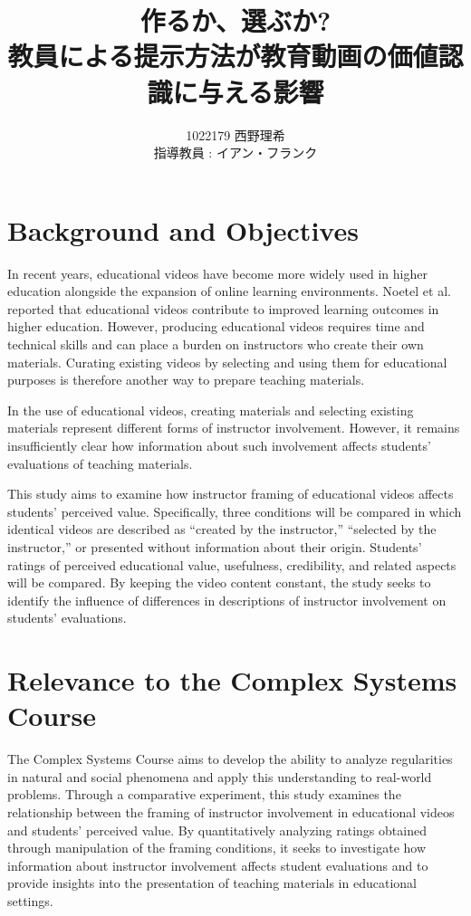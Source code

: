 \documentclass[11pt]{ltjarticle}
\author{%
1022179 西野理希\\指導教員 : イアン・フランク
}
\title{作るか、選ぶか?\\教員による提示方法が教育動画の価値認識に与える影響}
\begin{document}
\maketitle

\section{Background and Objectives}

In recent years, educational videos have become more widely used in higher education alongside the expansion of online learning environments. Noetel et al.\ \cite{noetel2021} reported that educational videos contribute to improved learning outcomes in higher education. However, producing educational videos requires time and technical skills and can place a burden on instructors who create their own materials. Curating existing videos by selecting and using them for educational purposes is therefore another way to prepare teaching materials.

In the use of educational videos, creating materials and selecting existing materials represent different forms of instructor involvement. However, it remains insufficiently clear how information about such involvement affects students' evaluations of teaching materials.

This study aims to examine how instructor framing of educational videos affects students' perceived value. Specifically, three conditions will be compared in which identical videos are described as ``created by the instructor,'' ``selected by the instructor,'' or presented without information about their origin. Students' ratings of perceived educational value, usefulness, credibility, and related aspects will be compared. By keeping the video content constant, the study seeks to identify the influence of differences in descriptions of instructor involvement on students' evaluations.

\section{Relevance to the Complex Systems Course}

The Complex Systems Course aims to develop the ability to analyze regularities in natural and social phenomena and apply this understanding to real-world problems. Through a comparative experiment, this study examines the relationship between the framing of instructor involvement in educational videos and students' perceived value. By quantitatively analyzing ratings obtained through manipulation of the framing conditions, it seeks to investigate how information about instructor involvement affects student evaluations and to provide insights into the presentation of teaching materials in educational settings.
\end{document}
